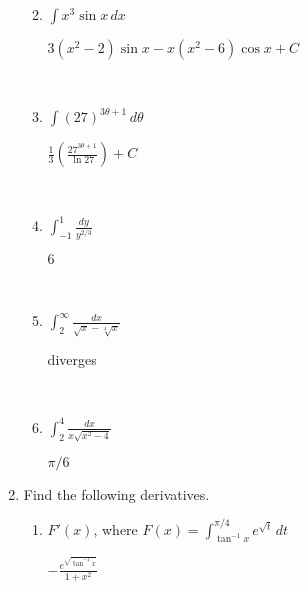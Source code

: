 \documentclass[]{handout}
\begin{document}
\begin{enumerate}[(1)]
\begin{enumerate}
		\

		\item $\displaystyle\int x^3 \sin x \, dx$  %

\begin{answer} $3(x^2 - 2)\sin x - x(x^2 - 6) \cos x + C$
\end{answer}

		\

		\item $\displaystyle\int (27)^{3\theta + 1}\, d\theta$  %

\begin{answer} 
		$\displaystyle \frac{1}{3} \left(\frac{27^{3 \theta + 1}}{\ln 27} \right) + C$
\end{answer}

		\

		\item $\displaystyle\int_{-1}^1 \frac{dy}{y^{2/3}}$  %

\begin{answer} $6$
\end{answer}

		\

		\item $\displaystyle\int_2^\infty\frac{dx}{\sqrt{x}-\sqrt[4]{x}}$ %

\begin{answer} diverges
\end{answer}

		\

		\item $\displaystyle\int_2^4\frac{dx}{x\sqrt{x^2-4}}$ %

\begin{answer} $\pi/6$
\end{answer}

	\end{enumerate}



	\item Find the following derivatives.

	\begin{enumerate}

		\item $F'(x)$, where $\displaystyle F(x) = \int_{\tan^{-1} x}^{\pi/4} e^{\sqrt t}\, dt$

\begin{answer} 
		$\displaystyle - \frac{e^{\sqrt{\tan^{-1} x}}}{1+x^2}$
\end{answer}


\end{enumerate}
\end{enumerate}
\end{document}
